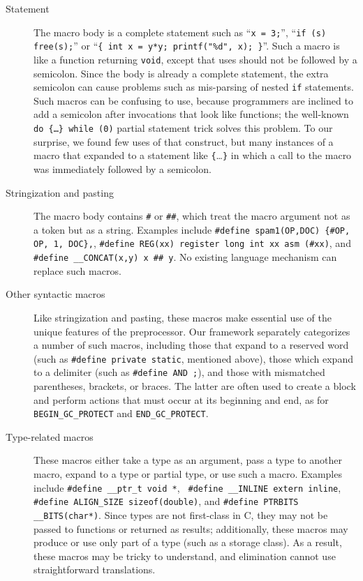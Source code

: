\documentclass[11pt]{article}
\begin{document}
\begin{description}

\item[Statement]  The macro body is a complete statement such as
  ``{\tt x = 3;}'', ``{\tt if (s) free(s);}'' or ``{\tt \verb|{| int x =
    y*y; printf("\%d", x); \verb|}|}''.  Such a macro is like a function
    returning {\tt void}, except that uses should not be followed by a
    semicolon.  Since the body is already a complete statement, the extra
    semicolon can cause problems such as mis-parsing of nested {\tt if}
    statements.  Such macros can be confusing to use, because programmers
    are inclined to add a semicolon after invocations that look like
    functions; the well-known {\tt do \verb|{|\ldots\verb|}| while (0)}
    partial statement trick solves this problem.  To our surprise, we found
    few uses of that construct, but many instances of a macro that expanded
    to a statement like \verb|{|\ldots\verb|}| in which a call to the macro
    was immediately followed by a semicolon.

\item[Stringization and pasting]  The macro body contains {\tt \#} or
  {\tt \#\#}, which treat the macro argument not as a token but as a
  string.  Examples include {\tt \#define spam1(OP,DOC) \verb|{|\#OP, OP,
    1, DOC\verb|}|,}, {\tt \#define REG(xx) register long int xx asm
    (\#xx)}, and {\tt \#define \verb|__CONCAT|(x,y) x \#\# y}.  No existing
  language mechanism can replace such macros.

\item[Other syntactic macros]  Like stringization and pasting, these
  macros make essential use of the unique features of the preprocessor.
  Our framework separately categorizes a number of such macros, including
  those that expand to a reserved word (such as {\tt \#define private
  static}, mentioned above), those which expand to a delimiter (such as
{\tt \#define AND ;}), and those with mismatched parentheses, brackets, or
braces.  The latter are often used to create a block and perform actions
that must occur at its beginning and end, as for \verb|BEGIN_GC_PROTECT|
and \verb|END_GC_PROTECT|.

\item[Type-related macros]  These macros either take a type as an argument, pass
  a type to another macro, expand to a type or partial type, or use such a
  macro.  Examples include {\tt \#define \verb|__ptr_t| void *}, {\tt
  \#define \verb|__INLINE| extern inline}, {\tt \#define \verb|ALIGN_SIZE|
sizeof(double)}, and {\tt \#define PTRBITS \verb|__BITS|(char*)}.  Since
types are not first-class in C, they may not be passed to functions or
returned as results; additionally, these macros may produce or use only
part of a type (such as a storage class).  As a result, these macros may be
tricky to understand, and elimination cannot use straightforward
translations.


\end{description}
\end{document}
